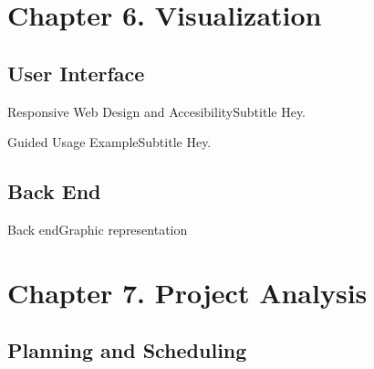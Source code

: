 \documentclass{beamer}
\begin{document}
\section{Chapter 6. Visualization}

\subsection{User Interface}

\begin{frame}{Responsive Web Design and Accesibility}{Subtitle}
  Hey.
\end{frame}

\begin{frame}{Guided Usage Example}{Subtitle}
  Hey.
\end{frame}


\subsection{Back End}

\begin{frame}{Back end}{Graphic representation}
  \centering
  \scalebox{.55}{}
\end{frame}



\section{Chapter 7. Project Analysis}

\subsection{Planning and Scheduling}
\end{document}
